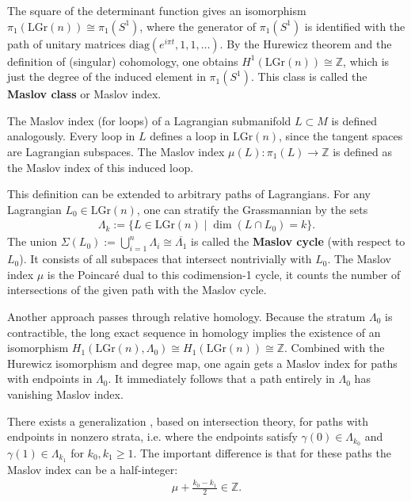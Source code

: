     \begin{property}
        The square of the determinant function gives an isomorphism $\pi_1(\mathrm{LGr}(n))\cong\pi_1(S^1)$, where the generator of $\pi_1(S^1)$ is identified with the path of unitary matrices $\mathrm{diag}(e^{i\pi t},1,1,\ldots)$. By the Hurewicz theorem and the definition of (singular) cohomology, one obtains $H^1(\mathrm{LGr}(n))\cong\mathbb{Z}$, which is just the degree of the induced element in $\pi_1(S^1)$. This class is called the \textbf{Maslov class} or Maslov index.

        The Maslov index (for loops) of a Lagrangian submanifold $L\subset M$ is defined analogously. Every loop in $L$ defines a loop in $\mathrm{LGr}(n)$, since the tangent spaces are Lagrangian subspaces. The Maslov index $\mu(L):\pi_1(L)\rightarrow\mathbb{Z}$ is defined as the Maslov index of this induced loop.

        This definition can be extended to arbitrary paths of Lagrangians. For any Lagrangian $L_0\in\mathrm{LGr}(n)$, one can stratify the Grassmannian by the sets
        \begin{gather}
            \Lambda_k := \{L\in\mathrm{LGr}(n)\mid\dim(L\cap L_0) = k\}.
        \end{gather}
        The union $\Sigma(L_0):=\bigcup_{i=1}^n\Lambda_i\cong\overline{\Lambda_1}$ is called the \textbf{Maslov cycle} (with respect to $L_0$). It consists of all subspaces that intersect nontrivially with $L_0$. The Maslov index $\mu$ is the Poincar\'e dual to this codimension-1 cycle, it counts the number of intersections of the given path with the Maslov cycle.

        Another approach passes through relative homology. Because the stratum $\Lambda_0$ is contractible, the long exact sequence in homology implies the existence of an isomorphism $H_1(\mathrm{LGr}(n),\Lambda_0)\cong H_1(\mathrm{LGr}(n))\cong\mathbb{Z}$. Combined with the Hurewicz isomorphism and degree map, one again gets a Maslov index for paths with endpoints in $\Lambda_0$. It immediately follows that a path entirely in $\Lambda_0$ has vanishing Maslov index.
    \end{property}
    \begin{remark}
        There exists a generalization \cite{path_maslov}, based on intersection theory, for paths with endpoints in nonzero strata, i.e. where the endpoints satisfy $\gamma(0)\in\Lambda_{k_0}$ and $\gamma(1)\in\Lambda_{k_1}$ for $k_0,k_1\geq1$. The important difference is that for these paths the Maslov index can be a half-integer:
        \begin{gather}
            \mu + \frac{k_0-k_1}{2}\in\mathbb{Z}.
        \end{gather}
    \end{remark}

